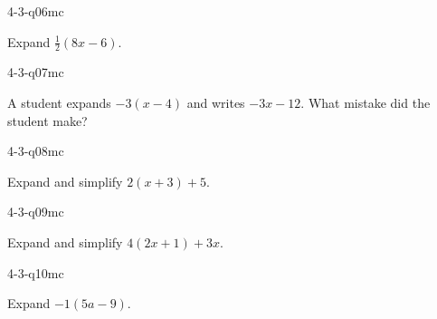 \begin{practiceQuestion}{4-3-q06}{mc}
\begin{questionText}
Expand $\frac{1}{2}(8x - 6)$.
\end{questionText}
\end{practiceQuestion}

\begin{practiceQuestion}{4-3-q07}{mc}
\begin{questionText}
A student expands $-3(x - 4)$ and writes $-3x - 12$. What mistake did the student make?
\end{questionText}
\end{practiceQuestion}

\begin{practiceQuestion}{4-3-q08}{mc}
\begin{questionText}
Expand and simplify $2(x + 3) + 5$.
\end{questionText}
\end{practiceQuestion}

\begin{practiceQuestion}{4-3-q09}{mc}
\begin{questionText}
Expand and simplify $4(2x + 1) + 3x$.
\end{questionText}
\end{practiceQuestion}

\begin{practiceQuestion}{4-3-q10}{mc}
\begin{questionText}
Expand $-1(5a - 9)$.
\end{questionText}
\end{practiceQuestion}

